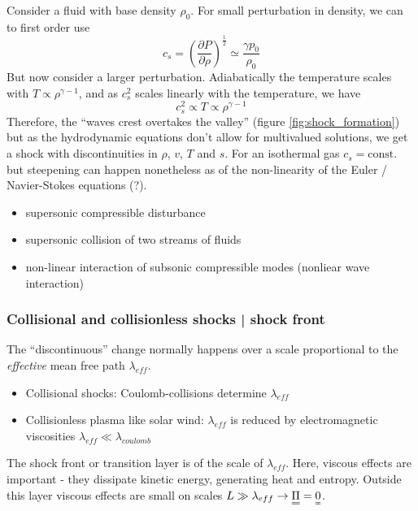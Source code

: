 Consider a fluid with base density $\rho_0$. For small perturbation in density, we can to first order
use
\begin{equation}
    c_s = \left( \frac{\partial P}{\partial \rho} \right)^{\frac{1}{2}} \simeq \frac{\gamma p_0}{\rho_0}
\end{equation}
But now consider a larger perturbation. Adiabatically the temperature scales with $T \propto \rho^{\gamma - 1}$, and as $c_s^2$ scales
linearly with the temperature, we have
\begin{equation}
    c_s^2 \propto T \propto \rho^{\gamma - 1} 
\end{equation}
Therefore, the “waves crest overtakes the valley” (figure \ref{fig:shock_formation}) but as the hydrodynamic equations don't allow for multivalued solutions, we get a shock
with discontinuities in $\rho$, $v$, $T$ and $s$. For an isothermal gas $c_s = \text{const.}$ but steepening can happen
nonetheless as of the non-linearity of the Euler / Navier-Stokes equations (?).

\begin{itemize}
    \item supersonic compressible disturbance
    \item supersonic collision of two streams of fluids
    \item non-linear interaction of subsonic compressible modes (nonliear wave interaction)
\end{itemize}

\subsubsection{Collisional and collisionless shocks | shock front}
The \enquote{discontinuous} change normally happens over a scale proportional to the \textit{effective} mean free path $\lambda_{eff}$.
\begin{itemize}
    \item Collisional shocks: Coulomb-collisions determine $\lambda_{eff}$
    \item Collisionless plasma like solar wind: $\lambda_{eff}$ is reduced by electromagnetic viscosities $\lambda_{eff} \ll \lambda_{coulomb}$
\end{itemize}

The shock front or transition layer is of the scale of $\lambda_{eff}$. Here, viscous effects are important - they dissipate kinetic energy, generating heat and entropy. Outside this layer viscous effects are small on scales $L \gg \lambda_{eff} \rightarrow \mat{\Pi} = \mat{0}$.

